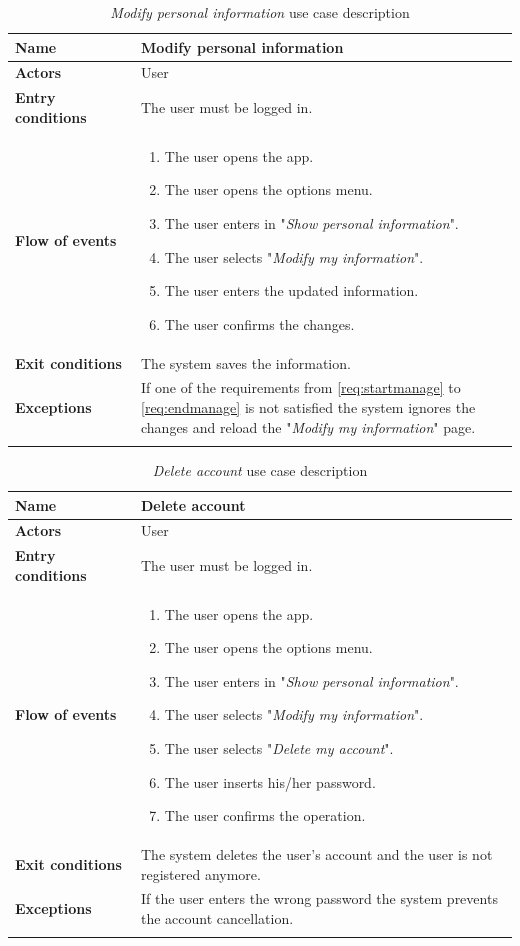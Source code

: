 \begin{longtable}{p{0.25\linewidth}|p{0.75\linewidth}}
	\hline
	\label{tab:modifypersonalinformation}
	\textbf{Name} & \textbf{Modify personal information} \\
	\hline
	\textbf{Actors} & User \\
	\hline
	\textbf{Entry conditions} & The user must be logged in.\\
	\hline
	\textbf{Flow of events} & 
	\begin{enumerate}
		\item The user opens the app.
		\item The user opens the options menu.
		\item The user enters in "\emph{Show personal information}".
		\item The user selects "\emph{Modify my information}".
		\item The user enters the updated information.
		\item The user confirms the changes.
	\end{enumerate}\\
	\hline
	\textbf{Exit conditions} & The system saves the information.\\
	\hline
	\textbf{Exceptions} & If one of the requirements from \ref{req:startmanage} to \ref{req:endmanage} is not satisfied the system ignores the changes and reload the "\emph{Modify my information}" page. \\
	\hline
	\caption{\emph{Modify personal information} use case description}
\end{longtable}

\newpage
\begin{longtable}{p{0.25\linewidth}|p{0.75\linewidth}}
	\hline
	\label{tab:deleteaccount}
	\textbf{Name} & \textbf{Delete account} \\
	\hline
	\textbf{Actors} & User \\
	\hline
	\textbf{Entry conditions} & The user must be logged in.\\
	\hline
	\textbf{Flow of events} & 
	\begin{enumerate}
		\item The user opens the app.
		\item The user opens the options menu.
		\item The user enters in "\emph{Show personal information}".
		\item The user selects "\emph{Modify my information}".
		\item The user selects "\emph{Delete my account}".
		\item The user inserts his/her password.
		\item The user confirms the operation.
	\end{enumerate}\\
	\hline
	\textbf{Exit conditions} & The system deletes the user's account and the user is not registered anymore.\\
	\hline
	\textbf{Exceptions} & If the user enters the wrong password the system prevents the account cancellation. \\
	\hline
	\caption{\emph{Delete account} use case description}
\end{longtable}


